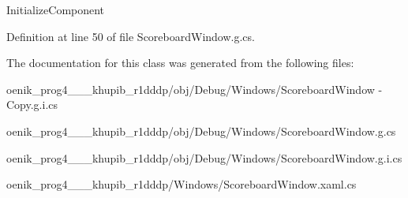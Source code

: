 Initialize\+Component 



Definition at line 50 of file Scoreboard\+Window.\+g.\+cs.



The documentation for this class was generated from the following files\+:\begin{DoxyCompactItemize}
\item 
oenik\+\_\+prog4\+\_\+\_\+\_\+khupib\+\_\+r1dddp/obj/\+Debug/\+Windows/Scoreboard\+Window -\/ Copy.\+g.\+i.\+cs\item 
oenik\+\_\+prog4\+\_\+\_\+\_\+khupib\+\_\+r1dddp/obj/\+Debug/\+Windows/Scoreboard\+Window.\+g.\+cs\item 
oenik\+\_\+prog4\+\_\+\_\+\_\+khupib\+\_\+r1dddp/obj/\+Debug/\+Windows/Scoreboard\+Window.\+g.\+i.\+cs\item 
oenik\+\_\+prog4\+\_\+\_\+\_\+khupib\+\_\+r1dddp/\+Windows/Scoreboard\+Window.\+xaml.\+cs\end{DoxyCompactItemize}
